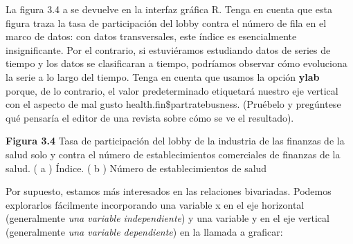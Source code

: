 \documentclass[
]{book}
\newenvironment{Shaded}{\begin{snugshade}}{\end{snugshade}}
\newcommand{\AttributeTok}[1]{\textcolor[rgb]{0.77,0.63,0.00}{#1}}
\newcommand{\FunctionTok}[1]{\textcolor[rgb]{0.00,0.00,0.00}{#1}}
\newcommand{\NormalTok}[1]{#1}
\newcommand{\SpecialCharTok}[1]{\textcolor[rgb]{0.00,0.00,0.00}{#1}}
\newcommand{\StringTok}[1]{\textcolor[rgb]{0.31,0.60,0.02}{#1}}
\begin{document}
\begin{Shaded}
\end{Shaded}

La figura 3.4 a se devuelve en la interfaz gráfica R. Tenga en cuenta que esta figura traza la tasa de participación del lobby contra el número de fila en el marco de datos: con datos transversales, este índice es esencialmente insignificante. Por el contrario, si estuviéramos estudiando datos de series de tiempo y los datos se clasificaran a tiempo, podríamos observar cómo evoluciona la serie a lo largo del tiempo. Tenga en cuenta que usamos la opción \textbf{ylab} porque, de lo contrario, el valor predeterminado etiquetará nuestro eje vertical con el aspecto de mal gusto health.fin\$partratebusness. (Pruébelo y pregúntese qué pensaría el editor de una revista sobre cómo se ve el resultado).

\textbf{Figura 3.4} Tasa de participación del lobby de la industria de las finanzas de la salud solo y contra el número de establecimientos comerciales de finanzas de la salud. ( a ) Índice. ( b ) Número de establecimientos de salud

Por supuesto, estamos más interesados \hspace{0pt}\hspace{0pt}en las relaciones bivariadas. Podemos explorarlos fácilmente incorporando una variable x en el eje horizontal (generalmente \emph{una variable independiente}) y una variable y en el eje vertical (generalmente \emph{una variable dependiente}) en la llamada a graficar:

\begin{Shaded}
\end{Shaded}
\end{document}
